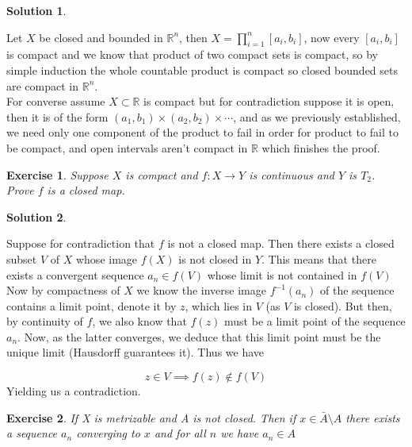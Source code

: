 \documentclass[11pt,a4paper]{article}
\newtheorem{Ex}{Exercise}
\newtheorem{Sol}{Solution}
\begin{document}
\begin{Sol} \end{Sol}
Let $X$ be closed and bounded in $\mathbb{R}^n$, then $X = \prod_{i=1}^{n}[a_i,b_i]$, now every $[a_i,b_i]$ is compact and we know that product of two compact sets is compact, so by simple induction the whole countable product is compact so closed bounded sets are compact in $\mathbb{R}^n$. \\
For converse assume $X \subset \mathbb{R}$ is compact but for contradiction suppose it is open, then it is of the form $(a_1,b_1) \times (a_2,b_2) \times \cdots $, and as we previously established, we need only one component of the product to fail in order for product to fail to be compact, and open intervals aren't compact in $\mathbb{R}$ which finishes the proof.

\begin{Ex}
	Suppose $X$ is compact and $f: X \rightarrow Y$ is continuous and $Y$ is $T_2$. Prove $f$ is a closed map.
\end{Ex}  

\begin{Sol}\end{Sol}
Suppose for contradiction that $f$ is not a closed map. Then there exists a closed subset $V$ of $X$ whose image $f(X)$ is not closed in $Y$. This means that there exists a convergent sequence $a_n \in f(V)$ whose limit is not contained in $f(V)$\\

Now by compactness of $X$ we know the inverse image $f^{-1}(a_n)$ of the sequence contains a limit point, denote it by $z$, which lies in $V$ (as $V$ is closed). But then, by continuity of $f$, we also know that $f(z)$ must be a limit point of the sequence $a_n$. Now, as the latter converges, we deduce that this limit point must be the unique limit (Hausdorff guarantees it). Thus we have

$$z \in V \implies f(z)\not \in f(V)$$ 
Yielding us a contradiction.

\begin{Ex}
	If X is metrizable and A is not closed. Then if $x \in \bar{A}\setminus A$ there exists a sequence $a_n$ converging to $x$ and for all $n$ we have $a_n \in A$
\end{Ex}
\end{document}
